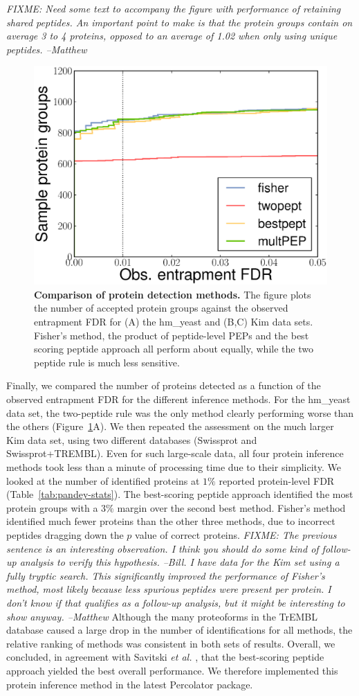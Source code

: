 \documentclass{article}
\begin{document}
{\em FIXME: Need some text to accompany the figure with performance of
  retaining shared peptides. An important point to make is that the
  protein groups contain on average 3 to 4 proteins, opposed to an
  average of 1.02 when only using unique peptides. --Matthew}

\begin{figure}
  \centering
  \includegraphics[width=0.45\linewidth]{./img/unique-pept-performance}
  \caption{{\bf Comparison of protein detection methods.}  The figure
    plots the number of accepted protein groups against the observed
    entrapment FDR for (A) the hm\_yeast and (B,C) Kim data
    sets. Fisher's method, the product of peptide-level PEPs and the
    best scoring peptide approach all perform about equally, while the
    two peptide rule is much less sensitive.}
  \label{fig:power}
\end{figure}

Finally, we compared the number of proteins detected as a function of
the observed entrapment FDR for the different inference methods.  For
the hm\_yeast data set, the two-peptide rule was the only method
clearly performing worse than the others (Figure~\ref{fig:power}A).
We then repeated the assessment on the much larger Kim data set, using
two different databases (Swissprot and Swissprot+TREMBL).  Even for
such large-scale data, all four protein inference methods took less
than a minute of processing time due to their simplicity. We looked at
the number of identified proteins at $1\%$ reported protein-level FDR
(Table~\ref{tab:pandey-stats}).  The best-scoring peptide approach
identified the most protein groups with a $3\%$ margin over the second
best method. Fisher's method identified much fewer proteins than the
other three methods, due to incorrect peptides dragging down the $p$
value of correct proteins. {\em FIXME: The previous sentence is an
interesting observation. I think you should do some kind of follow-up
analysis to verify this hypothesis. --Bill. I have data for the Kim
set using a fully tryptic search. This significantly improved the
performance of Fisher's method, most likely because less spurious
peptides were present per protein. I don't know if that qualifies as a
follow-up analysis, but it might be interesting to show
anyway. --Matthew} Although the many proteoforms in the TrEMBL
  database caused a large drop in the number of identifications for
  all methods, the relative ranking of methods was consistent in both
  sets of results. Overall, we concluded, in agreement with Savitski
  {\em et al.}  \cite{savitski2015scalable}, that the best-scoring
  peptide approach yielded the best overall performance.  We therefore
  implemented this protein inference method in the latest Percolator
  package.
\end{document}
